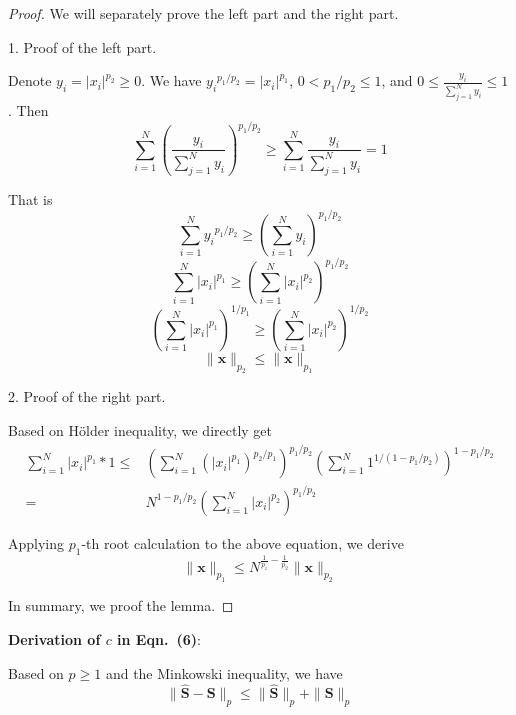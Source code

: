 \documentclass[sigconf]{acmart}
\begin{document}
\begin{proof}
We will separately prove the left part and the right part.

1. Proof of the left part.

Denote $y_i=|x_i|^{p_2}\ge0$. We have ${y_i}^{p_1/p_2}=|x_i|^{p_1}$, $0<p_1/p_2\le1$, and $0\le\frac{y_i}{\sum_{j=1}^N y_i}\le1$. Then
\begin{equation}
\sum_{i=1}^N \left(\frac{y_i}{\sum_{j=1}^N y_i}\right)^{p_1/p_2} \ge \sum_{i=1}^N {\frac{y_i}{\sum_{j=1}^N y_i}}=1
\end{equation}

That is
\begin{equation}
\sum_{i=1}^N {y_i}^{p_1/p_2} \ge \left(\sum_{i=1}^N {y_i}\right)^{p_1/p_2}
\end{equation}
\begin{equation}
\sum_{i=1}^N {|x_i|}^{p_1} \ge \left(\sum_{i=1}^N {|x_i|^{p_2}}\right)^{p_1/p_2}
\end{equation}
\begin{equation}
\left(\sum_{i=1}^N {|x_i|}^{p_1}\right)^{1/p_1} \ge \left(\sum_{i=1}^N {|x_i|^{p_2}}\right)^{1/p_2}
\end{equation}
\begin{equation}
\|{\mathbf{x}}\|_{p_2}\le\|{\mathbf{x}}\|_{p_1}
\end{equation}

2. Proof of the right part.

Based on H\"older inequality, we directly get
\begin{align}
\sum_{i=1}^N {|x_i|^{p_1}*1} \le & \left(\sum_{i=1}^N (|x_i|^{p_1})^{p_2/p_1}\right)^{p_1/p_2}\left(\sum_{i=1}^N {1^{1/(1-p_1/p_2)}}\right)^{1-p_1/p_2}\nonumber\\
=&N^{1-p_1/p_2}\left(\sum_{i=1}^N |x_i|^{p_2}\right)^{p_1/p_2}
\end{align}

Applying $p_1$-th root calculation to the above equation, we derive
\begin{equation}
\|{\mathbf{x}}\|_{p_1}\le N^{\frac{1}{p_1}-\frac{1}{p_2}}\|{\mathbf{x}}\|_{p_2}
\end{equation}

In summary, we proof the lemma.
\end{proof}

\textbf{Derivation of $c$ in Eqn.~(6)}:

Based on $p\ge1$ and the Minkowski inequality, we have
\begin{equation}
\|\hat{\mathbf{S}}-{\mathbf{S}}\|_p\le  \|\hat{\mathbf{S}}\|_p + \|{\mathbf{S}}\|_p
\end{equation}
\end{document}
